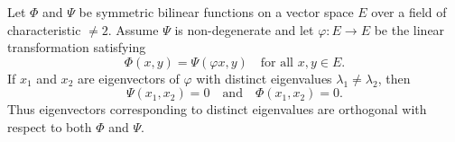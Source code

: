 Let $\Phi$ and $\Psi$ be symmetric bilinear functions on a vector space $E$ over a field of characteristic $\neq 2$. Assume $\Psi$ is non-degenerate and let $\varphi: E \to E$ be the linear transformation satisfying
$$\Phi(x, y) = \Psi(\varphi x, y) \quad \text{for all } x, y \in E.$$
If $x_1$ and $x_2$ are eigenvectors of $\varphi$ with distinct eigenvalues $\lambda_1 \neq \lambda_2$, then
$$\Psi(x_1, x_2) = 0 \quad \text{and} \quad \Phi(x_1, x_2) = 0.$$
Thus eigenvectors corresponding to distinct eigenvalues are orthogonal with respect to both $\Phi$ and $\Psi$.
